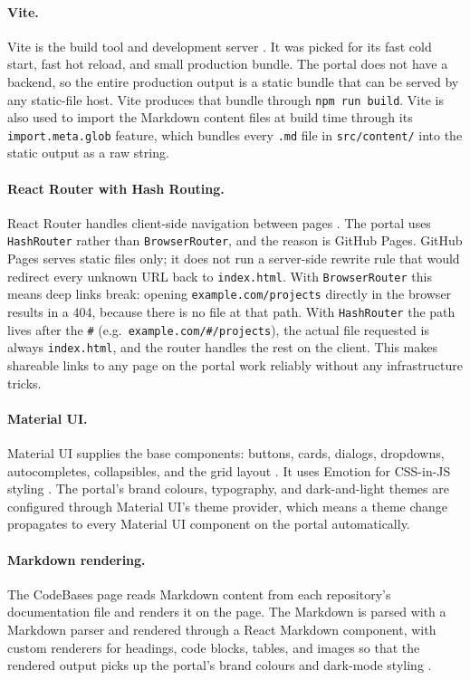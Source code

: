 \paragraph{Vite.}
Vite is the build tool and development server \cite{vite}. It was picked for its fast cold start, fast hot reload, and small production bundle. The portal does not have a backend, so the entire production output is a static bundle that can be served by any static-file host. Vite produces that bundle through \texttt{npm run build}. Vite is also used to import the Markdown content files at build time through its \texttt{import.meta.glob} feature, which bundles every \texttt{.md} file in \texttt{src/content/} into the static output as a raw string.

\paragraph{React Router with Hash Routing.}
React Router handles client-side navigation between pages \cite{reactrouter}. The portal uses \texttt{HashRouter} rather than \texttt{BrowserRouter}, and the reason is GitHub Pages. GitHub Pages serves static files only; it does not run a server-side rewrite rule that would redirect every unknown URL back to \texttt{index.html}. With \texttt{BrowserRouter} this means deep links break: opening \texttt{example.com/projects} directly in the browser results in a 404, because there is no file at that path. With \texttt{HashRouter} the path lives after the \texttt{\#} (e.g.\ \texttt{example.com/\#/projects}), the actual file requested is always \texttt{index.html}, and the router handles the rest on the client. This makes shareable links to any page on the portal work reliably without any infrastructure tricks.

\paragraph{Material UI.}
Material UI supplies the base components: buttons, cards, dialogs, dropdowns, autocompletes, collapsibles, and the grid layout \cite{mui}. It uses Emotion for CSS-in-JS styling \cite{emotion}. The portal's brand colours, typography, and dark-and-light themes are configured through Material UI's theme provider, which means a theme change propagates to every Material UI component on the portal automatically.

\paragraph{Markdown rendering.}
The CodeBases page reads Markdown content from each repository's documentation file and renders it on the page. The Markdown is parsed with a Markdown parser and rendered through a React Markdown component, with custom renderers for headings, code blocks, tables, and images so that the rendered output picks up the portal's brand colours and dark-mode styling \cite{markdownit, reactmarkdown, commonmark}.

